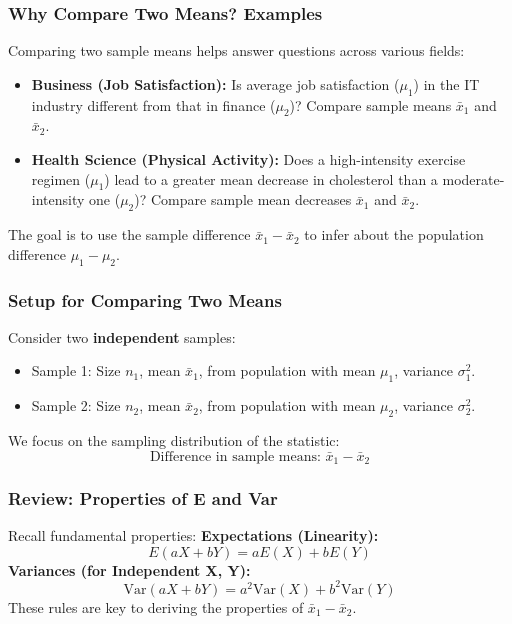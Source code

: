 \documentclass[handout]{beamer} %
\begin{document}

\begin{frame}
\frametitle{Why Compare Two Means? Examples}
Comparing two sample means helps answer questions across various fields:

\pause
\begin{itemize}
    \item \textbf{Business (Job Satisfaction):} Is average job satisfaction (\(\mu_1\)) in the IT industry different from that in finance (\(\mu_2\))? Compare sample means \( \bar{x}_1 \) and \( \bar{x}_2 \).
    \pause
    \item \textbf{Health Science (Physical Activity):} Does a high-intensity exercise regimen (\(\mu_1\)) lead to a greater mean decrease in cholesterol than a moderate-intensity one (\(\mu_2\))? Compare sample mean decreases \( \bar{x}_1 \) and \( \bar{x}_2 \).
\end{itemize}
\pause
The goal is to use the sample difference \( \bar{x}_1 - \bar{x}_2 \) to infer about the population difference \( \mu_1 - \mu_2 \).
\end{frame}

\begin{frame}
\frametitle{Setup for Comparing Two Means} %
Consider two \textbf{independent} samples:
\begin{itemize}
    \item Sample 1: Size \( n_1 \), mean \( \bar{x}_1 \), from population with mean \(\mu_1\), variance \(\sigma^2_1\).
    \item Sample 2: Size \( n_2 \), mean \( \bar{x}_2 \), from population with mean \(\mu_2\), variance \(\sigma^2_2\).
\end{itemize}
\pause
We focus on the sampling distribution of the statistic:
\[
\text{Difference in sample means: } \bar{x}_1 - \bar{x}_2
\]
\end{frame}

\begin{frame}
\frametitle{Review: Properties of E and Var} %
Recall fundamental properties:
\textbf{Expectations (Linearity):}
\[
E(aX + bY) = aE(X) + bE(Y)
\]
\pause
\textbf{Variances (for Independent X, Y):}
\[
\text{Var}(aX + bY) = a^2\text{Var}(X) + b^2\text{Var}(Y)
\]
These rules are key to deriving the properties of \( \bar{x}_1 - \bar{x}_2 \).
\end{frame}
\end{document}
